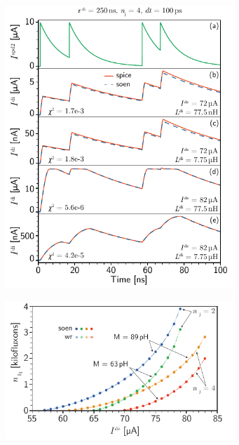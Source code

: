 \documentclass[twocolumn]{article}
\begin{document}
\begin{figure}[h!]
\includegraphics[width=8.6cm]{figures/_fig__synapses__comparison__4jj__pulse_sequence.pdf}
\end{figure}

\begin{figure}[h!]
\includegraphics[width=8.6cm]{figures/_fig__synapses__nfq_vs_Ide.pdf}
\end{figure}
\end{document}
